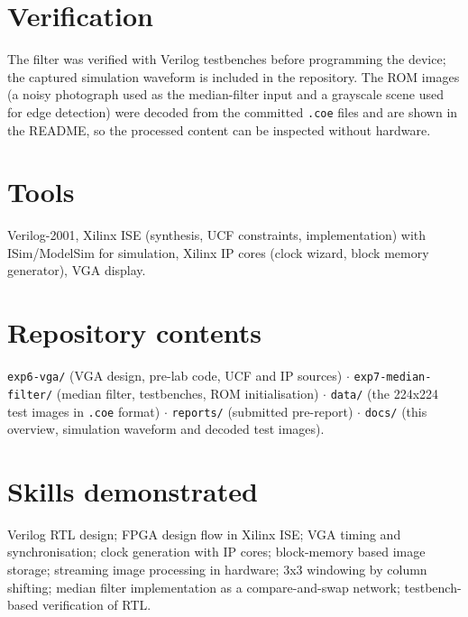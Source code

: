 \documentclass[10pt,a4paper]{article}
\begin{document}
\section*{Verification}
The filter was verified with Verilog testbenches before programming the device; the captured simulation waveform is
included in the repository. The ROM images (a noisy photograph used as the median-filter input and a grayscale scene
used for edge detection) were decoded from the committed \texttt{.coe} files and are shown in the README, so the
processed content can be inspected without hardware.

\section*{Tools}
Verilog-2001, Xilinx ISE (synthesis, UCF constraints, implementation) with ISim/ModelSim for simulation, Xilinx IP
cores (clock wizard, block memory generator), VGA display.

\section*{Repository contents}
\texttt{exp6-vga/} (VGA design, pre-lab code, UCF and IP sources) $\cdot$ \texttt{exp7-median-filter/} (median filter,
testbenches, ROM initialisation) $\cdot$ \texttt{data/} (the 224x224 test images in \texttt{.coe} format) $\cdot$
\texttt{reports/} (submitted pre-report) $\cdot$ \texttt{docs/} (this overview, simulation waveform and decoded test
images).

\section*{Skills demonstrated}
Verilog RTL design; FPGA design flow in Xilinx ISE; VGA timing and synchronisation; clock generation with IP cores;
block-memory based image storage; streaming image processing in hardware; 3x3 windowing by column shifting; median
filter implementation as a compare-and-swap network; testbench-based verification of RTL.
\end{document}
